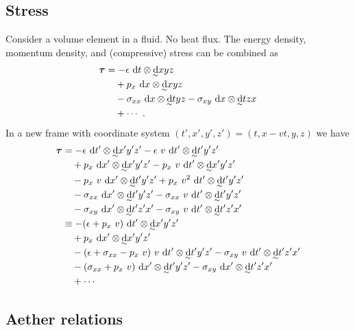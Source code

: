 \documentclass[\ifafour a4paper,12pt,\else a5paper,10pt,\fi%
onecolumn,oneside,article,%
british%
]{memoir}
\theoremstyle{remark}
\theoremstyle{innote}
\newcommand*{\di}{\mathrm{d}}%
\renewcommand*{\|}[1][]{\nonscript\:#1\vert\nonscript\:\mathopen{}}
\newcommand*{\tw}[2][\scriptstyle\sim]{\smash[b]{\underset{\mathclap{{}^{#1}}}{#2}}}
\newcommand*{\ti}[1][\scriptstyle\sim]{\tw[#1]{\di}}
\begin{document}
\subsection{Stress}
\label{sec:stress}

Consider a volume element in a fluid. No heat flux. The energy density, momentum density, and (compressive) stress can be combined as
\begin{equation}
  \label{eq:stress_rest}
  \begin{aligned}
    \bm{\tau} &=  -\epsilon\ \di t\otimes\ti xyz\\
    &\quad + p_{x}\ \di x\otimes\ti xyz\\
  &\quad-\sigma_{xx}\ \di x\otimes \ti tyz 
  -\sigma_{xy}\ \di x\otimes \ti tzx \\
&\quad+ \dotsb\ .
\end{aligned}
\end{equation}
In a new frame with coordinate system $(t',x',y',z')=(t,x-vt,y,z)$ we have
\begin{equation}
  \label{eq:stress_galmotion}
  \begin{aligned}
  \bm{\tau} &= -\epsilon\ \di t'\otimes\ti x'y'z'
  -\epsilon\ v\ \di t'\otimes\ti t'y'z'\\
  &\quad + p_{x}\ \di x'\otimes\ti x'y'z'
  - p_{x}\ v\ \di t'\otimes\ti x'y'z'\\
  &\quad- p_{x}\ v\ \di x'\otimes\ti t'y'z'
  + p_{x}\ v^{2}\ \di t'\otimes\ti t'y'z' \\
  &\quad-\sigma_{xx}\ \di x'\otimes\ti t'y'z'
  -\sigma_{xx}\ v\ \di t'\otimes\ti t'y'z'
  \\
  &\quad-\sigma_{xy}\ \di x'\otimes\ti t'z'x'
  -\sigma_{xy}\ v\ \di t'\otimes\ti t'z'x'
  \\
  &\equiv -(\epsilon + p_{x}\ v)\ \di t'\otimes\ti x'y'z'\\
  &\quad + p_{x}\ \di x'\otimes\ti x'y'z'\\
  &\quad-(\epsilon+\sigma_{xx}-p_{x}\ v)\ v\ \di t'\otimes\ti t'y'z'
 -\sigma_{xy}\ v\ \di t'\otimes\ti t'z'x'\\
 &\quad-(\sigma_{xx} + p_{x}\ v)\ \di x'\otimes\ti t'y'z'
 -\sigma_{xy}\ \di x'\otimes\ti t'z'x'\\
 &\quad+\dotsb
\end{aligned}
\end{equation}

\subsection{Aether relations}
\label{sec:aether}
\end{document}
